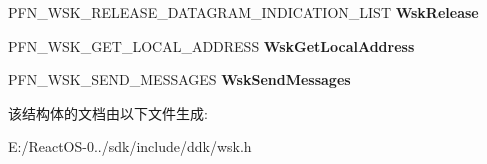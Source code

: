 \begin{DoxyCompactItemize}
P\+F\+N\+\_\+\+W\+S\+K\+\_\+\+R\+E\+L\+E\+A\+S\+E\+\_\+\+D\+A\+T\+A\+G\+R\+A\+M\+\_\+\+I\+N\+D\+I\+C\+A\+T\+I\+O\+N\+\_\+\+L\+I\+ST {\bfseries Wsk\+Release}
\item 
\mbox{\label{struct___w_s_k___p_r_o_v_i_d_e_r___d_a_t_a_g_r_a_m___d_i_s_p_a_t_c_h_a56b10a06d76421e3adabafeee5e1d20c}} 
P\+F\+N\+\_\+\+W\+S\+K\+\_\+\+G\+E\+T\+\_\+\+L\+O\+C\+A\+L\+\_\+\+A\+D\+D\+R\+E\+SS {\bfseries Wsk\+Get\+Local\+Address}
\item 
\mbox{\label{struct___w_s_k___p_r_o_v_i_d_e_r___d_a_t_a_g_r_a_m___d_i_s_p_a_t_c_h_a23761bb65d4ee57e54921958142ecfe0}} 
P\+F\+N\+\_\+\+W\+S\+K\+\_\+\+S\+E\+N\+D\+\_\+\+M\+E\+S\+S\+A\+G\+ES {\bfseries Wsk\+Send\+Messages}
\end{DoxyCompactItemize}


该结构体的文档由以下文件生成\+:\begin{DoxyCompactItemize}
\item 
E\+:/\+React\+O\+S-\/0../sdk/include/ddk/wsk.\+h\end{DoxyCompactItemize}
